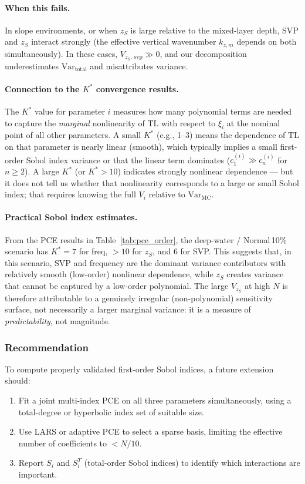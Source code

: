 \documentclass[11pt,a4paper]{article}
\newcommand{\Var}{\mathrm{Var}}
\newcommand{\TL}{\mathrm{TL}}
\begin{document}
\paragraph{When this fails.}
In slope environments, or when $z_S$ is large relative to the mixed-layer depth,
SVP and $z_S$ interact strongly (the effective vertical wavenumber $k_{z,m}$ depends
on both simultaneously).  In these cases, $V_{z_S,\,\mathrm{svp}} \gg 0$, and our
decomposition underestimates $\Var_\text{total}$ and misattributes variance.

\paragraph{Connection to the $K^*$ convergence results.}
The $K^*$ value for parameter $i$ measures how many polynomial terms are needed to
capture the \emph{marginal} nonlinearity of $\TL$ with respect to $\xi_i$ at the
nominal point of all other parameters.  A small $K^*$ (e.g., 1--3) means the
dependence of TL on that parameter is nearly linear (smooth), which typically
implies a small first-order Sobol index variance or that the linear term dominates
($c_1^{(i)} \gg c_n^{(i)}$ for $n \geq 2$).  A large $K^*$ (or $K^* > 10$)
indicates strongly nonlinear dependence — but it does not tell us whether that
nonlinearity corresponds to a large or small Sobol index; that requires knowing
the full $V_i$ relative to $\Var_\text{MC}$.

\paragraph{Practical Sobol index estimates.}
From the PCE results in Table~\ref{tab:pce_order}, the deep-water / Normal\,10\%
scenario has $K^* = 7$ for freq, $>10$ for $z_S$, and $6$ for SVP.
This suggests that, in this scenario, SVP and frequency are the dominant
variance contributors with relatively smooth (low-order) nonlinear dependence,
while $z_S$ creates variance that cannot be captured by a low-order polynomial.
The large $V_{z_S}$ at high $N$ is therefore attributable to a genuinely
irregular (non-polynomial) sensitivity surface, not necessarily a larger
marginal variance: it is a measure of \emph{predictability}, not magnitude.

\subsubsection{Recommendation}

To compute properly validated first-order Sobol indices, a future extension should:
\begin{enumerate}
  \item Fit a joint multi-index PCE on all three parameters simultaneously, using
        a total-degree or hyperbolic index set of suitable size.
  \item Use LARS or adaptive PCE to select a sparse basis, limiting the effective
        number of coefficients to $< N/10$.
  \item Report $S_i$ and $S_i^T$ (total-order Sobol indices) to identify which
        interactions are important.
\end{enumerate}
\end{document}
